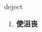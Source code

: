 
\begin{frame}
{\huge deject}
\begin{center}
\begin{enumerate}\Large
  \item \textbf{使沮丧}
\end{enumerate}
\end{center}
\end{frame}
